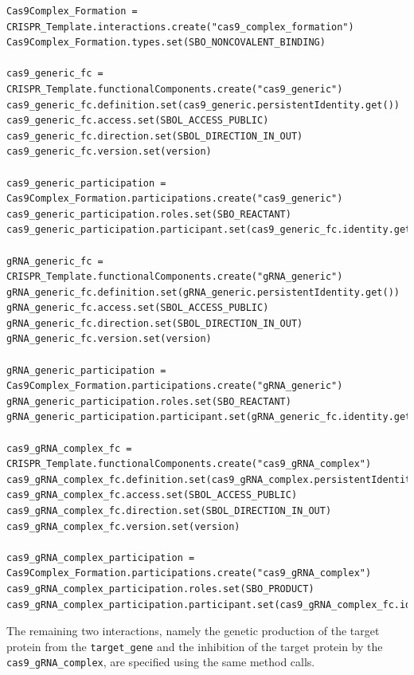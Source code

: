 \vspace{\abovedisplayskip}
\begin{minipage}{0.95\textwidth}%
\begin{lstlisting}
Cas9Complex_Formation = CRISPR_Template.interactions.create("cas9_complex_formation")
Cas9Complex_Formation.types.set(SBO_NONCOVALENT_BINDING)

cas9_generic_fc = CRISPR_Template.functionalComponents.create("cas9_generic")
cas9_generic_fc.definition.set(cas9_generic.persistentIdentity.get())
cas9_generic_fc.access.set(SBOL_ACCESS_PUBLIC)
cas9_generic_fc.direction.set(SBOL_DIRECTION_IN_OUT)
cas9_generic_fc.version.set(version)

cas9_generic_participation = Cas9Complex_Formation.participations.create("cas9_generic")
cas9_generic_participation.roles.set(SBO_REACTANT)
cas9_generic_participation.participant.set(cas9_generic_fc.identity.get())

gRNA_generic_fc = CRISPR_Template.functionalComponents.create("gRNA_generic")
gRNA_generic_fc.definition.set(gRNA_generic.persistentIdentity.get())
gRNA_generic_fc.access.set(SBOL_ACCESS_PUBLIC)
gRNA_generic_fc.direction.set(SBOL_DIRECTION_IN_OUT)
gRNA_generic_fc.version.set(version)

gRNA_generic_participation = Cas9Complex_Formation.participations.create("gRNA_generic")
gRNA_generic_participation.roles.set(SBO_REACTANT)
gRNA_generic_participation.participant.set(gRNA_generic_fc.identity.get())

cas9_gRNA_complex_fc = CRISPR_Template.functionalComponents.create("cas9_gRNA_complex")
cas9_gRNA_complex_fc.definition.set(cas9_gRNA_complex.persistentIdentity.get())
cas9_gRNA_complex_fc.access.set(SBOL_ACCESS_PUBLIC)
cas9_gRNA_complex_fc.direction.set(SBOL_DIRECTION_IN_OUT)
cas9_gRNA_complex_fc.version.set(version)

cas9_gRNA_complex_participation = Cas9Complex_Formation.participations.create("cas9_gRNA_complex")
cas9_gRNA_complex_participation.roles.set(SBO_PRODUCT)
cas9_gRNA_complex_participation.participant.set(cas9_gRNA_complex_fc.identity.get())
\end{lstlisting}
\end{minipage}

The remaining two interactions, namely the genetic production of the target protein from the \lstinline+target_gene+ and the inhibition of the target protein by the \lstinline+cas9_gRNA_complex+, are specified using the same method calls.

